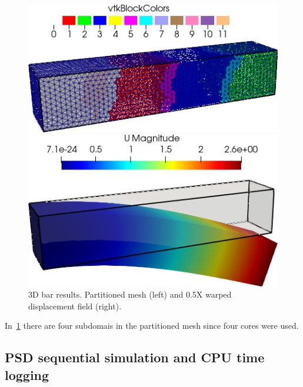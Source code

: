 \begin{figure}[htbp]
    \centering
    \begin{minipage}[t][2cm][t]{0.38\textwidth}
    \includegraphics[align=b,width=1\textwidth]{./Images/3d-bar-clamped-ends.png}
    \end{minipage}\hspace{.1\textwidth}
    \begin{minipage}[t][2cm][t]{0.4\textwidth}
    \includegraphics[align=b,width=1\textwidth]{./Images/3d-bar-clamped-pulled-partioned.png}
    \end{minipage}
    \caption{3D bar results. Partitioned mesh (left) and 0.5X warped displacement field (right).}
    \label{fig:3Dpart}
\end{figure}

In~\cref{fig:3Dpart} there are four subdomais in the partitioned mesh since four cores were used.

\pagebreak

\subsection{PSD sequential simulation  and CPU time logging \label{sec:seq-cpu}}

